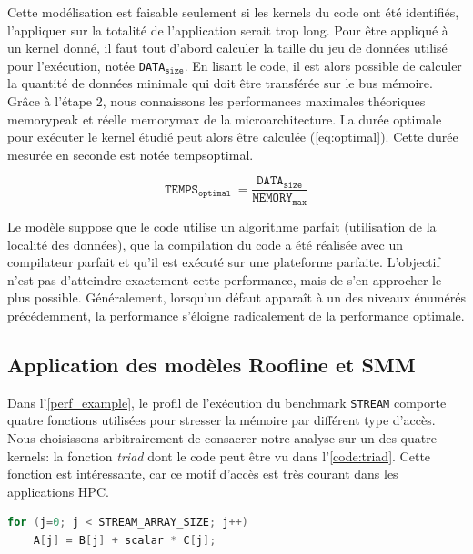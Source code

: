     Cette modélisation est faisable seulement si les \glspl{kernel} du code ont été identifiés, l'appliquer sur la totalité de l'application serait trop long. 
    Pour être appliqué à un kernel donné, il faut tout d'abord calculer la taille du jeu de données utilisé pour l'exécution, notée \texttt{DATA}$_\texttt{size}$. En lisant le code, il est alors possible de calculer la quantité de données minimale qui doit être transférée sur le bus mémoire. Grâce à l'étape 2, nous connaissons les performances maximales théoriques \gls{memorypeak} et réelle \gls{memorymax} de la microarchitecture. La durée optimale pour exécuter le kernel étudié peut alors être calculée (\autoref{eq:optimal}). Cette durée mesurée en seconde est notée \gls{tempsoptimal}. 
    
    \begin{equation}\label{eq:optimal}
        \texttt{TEMPS}_\texttt{optimal}\ = \frac{\texttt{DATA}_\texttt{size}}{\texttt{MEMORY}_\texttt{max}}
    \end{equation}

    
    Le modèle suppose que le code utilise un algorithme parfait (utilisation de la localité des données), que la compilation du code a été réalisée avec un compilateur parfait et qu'il est exécuté sur une plateforme parfaite. L'objectif n'est pas d'atteindre exactement cette performance, mais de s'en approcher le plus possible. Généralement, lorsqu'un défaut apparaît à un des niveaux énumérés précédemment, la performance s'éloigne radicalement de la performance optimale.
    
    




\subsection{Application des modèles Roofline et SMM}
    
    Dans l'\autoref{perf_example}, le profil de l'exécution du benchmark \verb|STREAM| comporte quatre fonctions utilisées pour stresser la mémoire par différent type d'accès. Nous choisissons arbitrairement de consacrer notre analyse sur un des quatre \glspl{kernel}: la fonction \textit{triad} dont le code peut être vu dans l'\autoref{code:triad}. Cette fonction est intéressante, car ce motif d'accès est très courant dans les applications HPC.
    
    
\begin{lstlisting}[language=c,caption=La fonction \textit{triad} du benchmark Stream utilise trois tableaux: deux en lecture et une en écriture,label={code:triad}, 
  basicstyle=\footnotesize, frame=tb,
  xleftmargin=.065\textwidth, xrightmargin=.065\textwidth]
for (j=0; j < STREAM_ARRAY_SIZE; j++)
    A[j] = B[j] + scalar * C[j];
\end{lstlisting}
        
